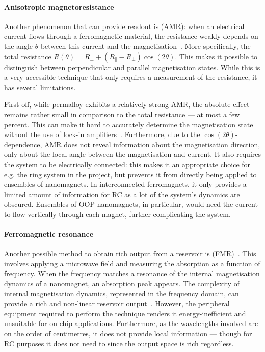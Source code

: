 \paragraph{Anisotropic magnetoresistance}
Another phenomenon that can provide readout is  (AMR): when an electrical current flows through a ferromagnetic material, the resistance weakly depends on the angle $\theta$ between this current and the magnetisation~\cite{AMR}.
More specifically, the total resistance $R(\theta) = R_\perp + (R_\parallel - R_\perp) \cos(2\theta)$.
This makes it possible to distinguish between perpendicular and parallel magnetisation states.
While this is a very accessible technique that only requires a measurement of the resistance, it has several limitations. \par
First off, while permalloy exhibits a relatively strong AMR, the absolute effect remains rather small in comparison to the total resistance --- at most a few percent.
This can make it hard to accurately determine the magnetisation state without the use of lock-in amplifiers~\cite{ArchitecturesNanoringRC,Vidamour2023}.
Furthermore, due to the $\cos(2 \theta)$-dependence, AMR does not reveal information about the magnetisation direction, only about the local angle between the magnetisation and current.
It also requires the system to be electrically connected: this makes it an appropriate choice for e.g. the ring system in the \spinengine project, but prevents it from directly being applied to ensembles of nanomagnets.
In interconnected ferromagnets, it only provides a limited amount of information for RC as a lot of the system's dynamics are obscured.
Ensembles of OOP nanomagnets, in particular, would need the current to flow vertically through each magnet, further complicating the system.

\paragraph{Ferromagnetic resonance}
Another possible method to obtain rich output from a reservoir is  (FMR)~\cite{AdaptiveProgrammableRC,gartside2022reconfigurable}.
This involves applying a microwave field and measuring the absorption as a function of frequency.
When the frequency matches a resonance of the internal magnetisation dynamics of a nanomagnet, an absorption peak appears.
The complexity of internal magnetisation dynamics, represented in the frequency domain, can provide a rich and non-linear reservoir output~\cite{AdaptiveProgrammableRC,Gomez-Iriarte_FMR}.
However, the peripheral equipment required to perform the technique renders it energy-inefficient and unsuitable for on-chip applications.
Furthermore, as the wavelengths involved are on the order of centimetres, it does not provide local information --- though for RC purposes it does not need to since the output space is rich regardless.

